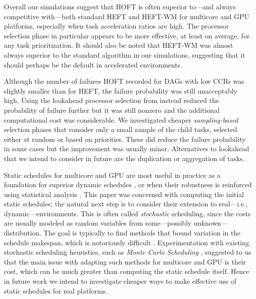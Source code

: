 \documentclass[runningheads]{llncs}
\begin{document}
Overall our simulations suggest that HOFT is often superior to---and always competitive with---both standard HEFT and HEFT-WM for multicore and GPU platforms, especially when task acceleration ratios are high. The processor selection phase in particular appears to be more effective, at least on average, for any task prioritization. It should also be noted that HEFT-WM was almost always superior to the standard algorithm in our simulations, suggesting that it should perhaps be the default in accelerated environments. 

Although the number of failures HOFT recorded for DAGs with low CCRs was slightly smaller than for HEFT, the failure probability was still unacceptably high. Using the lookahead processor selection from \cite{bittencourt10} instead reduced the probability of failure further but it was still nonzero and the additional computational cost was considerable. We investigated cheaper {\em sampling-based} selection phases that consider only a small sample of the child tasks, selected either at random or based on priorities. These did reduce the failure probability in some cases but the improvement was usually minor. Alternatives to lookahead that we intend to consider in future are the duplication \cite{duplication} or aggregation of tasks.

Static schedules for multicore and GPU are most useful in practice as a foundation for superior dynamic schedules \cite{agullo2016}, or when their robustness is reinforced using statistical analysis \cite{ZHENG20131673}. This paper was concerned with computing the initial static schedules; the natural next step is to consider their extension to real---i.e., dynamic---environments. This is often called {\em stochastic} scheduling, since the costs are usually modeled as random variables from some---possibly unknown---distribution. The goal is typically to find methods that bound variation in the schedule makespan, which is notoriously difficult \cite{hagstrom88}. Experimentation with existing stochastic scheduling heuristics, such as {\em Monte Carlo Scheduling} \cite{ZHENG20131673}, suggested to us that the main issue with adapting such methods for multicore and GPU is their cost, which can be much greater than computing the static schedule itself. Hence in future work we intend to investigate cheaper ways to make effective use of static schedules for real platforms.  






%
%
%
 
 
\end{document}
